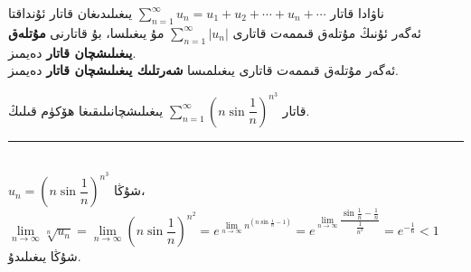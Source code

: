 \begin{colorful}[red]
ناۋادا قاتار
$\sum\limits_{n=1}^\infty u_n=u_1+u_2+\cdots+u_n+\cdots$
يىغىلىدىغان قاتار ئۇنداقتا\\
ئەگەر ئۇنىڭ مۇتلەق قىممەت قاتارى
$\sum\limits_{n=1}^\infty |u_n|$
مۇ يىغىلسا، بۇ قاتارنى
\textbf{مۇتلەق يىغىلىشچان قاتار}
دەيمىز.\\
ئەگەر مۇتلەق قىممەت قاتارى يىغىلمىسا 
\textbf{شەرتلىك يىغىلىشچان قاتار}
دەيمىز.
\end{colorful}

\begin{myexample}
	قاتار
	$\sum\limits_{n=1}^\infty\left(n\sin\dfrac{1}{n}\right)^{n^3}$
	يىغىلىشچانىلىقىغا ھۆكۈم قىلىڭ.
	\\\rule{\linewidth}{0.05em}\\
	$u_n=\left(n\sin\dfrac{1}{n}\right)^{n^3}$
	شۇڭا،\\
	$\lim\limits_{n\to\infty}\sqrt[n]{u_n}=\lim\limits_{n\to\infty}\left(n\sin\dfrac{1}{n}\right)^{n^2}=e^{\lim\limits_{n\to\infty}n^(n\sin\frac{1}{n}-1)}=e^{\lim\limits_{n\to\infty}\dfrac{\sin\frac{1}{n}-\frac{1}{n}}{\frac{1}{n^3}}}=e^{-\frac{1}{6}}<1$\\
	شۇڭا يىغىلىدۇ.
\end{myexample}

